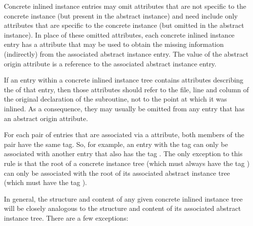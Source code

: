 Concrete inlined instance entries may omit attributes that
are not specific to the concrete instance (but present in
the abstract instance) and need include only attributes that
are specific to the concrete instance (but omitted in the
abstract instance). In place of these omitted attributes, each
\hypertarget{chap:DWATabstractorigininlineinstance}{}
concrete inlined instance entry 
has a 
\DWATabstractoriginDEFN{}
attribute that may be used to obtain the missing information
(indirectly) from the associated abstract instance entry. The
value of the abstract origin attribute is a reference to the
associated abstract instance entry.

If an entry within a concrete inlined instance tree contains
attributes describing the 
of that entry, then those attributes should refer to the file, line
and column of the original declaration of the subroutine,
not to the point at which it was inlined. As a consequence,
they may usually be omitted from any entry that has an abstract
origin attribute.

For each pair of entries that are associated via a
\DWATabstractorigin{} attribute, both members of the pair
have the same tag. So, for example, an entry with the tag
\DWTAGvariable{} can only be associated with another entry
that also has the tag \DWTAGvariable. The only exception
to this rule is that the root of a concrete instance tree
(which must always have the tag \DWTAGinlinedsubroutine)
can only be associated with the root of its associated abstract
instance tree (which must have the tag \DWTAGsubprogram).

In general, the structure and content of any given concrete
inlined instance tree will be closely analogous to the
structure and content of its associated abstract instance
tree. There are a few exceptions:

